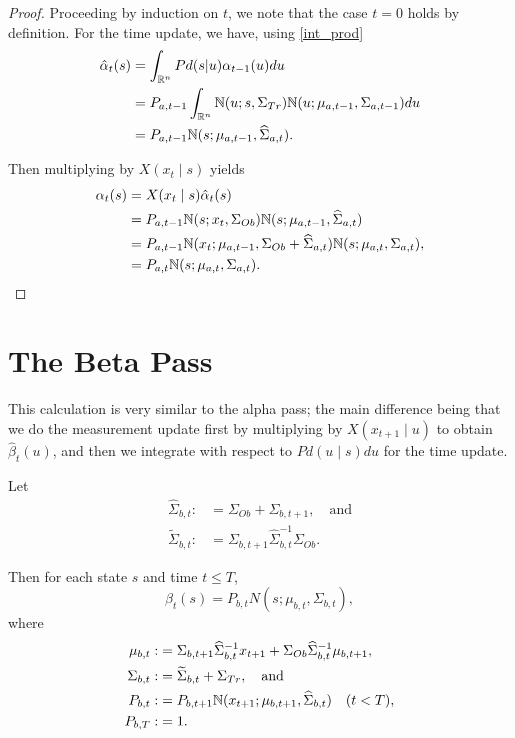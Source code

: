 \documentclass[12pt,leqno]{article}
\begin{document}
\begin{proof}

Proceeding by induction on $t$, we note that the case $t = 0$ holds by definition.
For the time update, we have, using \eqref{int_prod}
\begin{align}
  \hat{\alpha}_t(s) &= \int_{{\mathbb R}^n}Pd(s|u)\alpha_{t-1}(u)du \\\notag
 &= P_{a,t-1}\int_{{\mathbb R}^n}{\mathbb N}(u;s,\Sigma_{Tr}){\mathbb N}(u;\mu_{a,t-1},\Sigma_{a,t-1})du \notag\\
 &= P_{a,t-1}{\mathbb N}(s;\mu_{a,t-1},\widehat{\Sigma}_{a,t}).
\end{align}

Then multiplying by $X(x_t\mid s)$ yields
\begin{align*}
  \alpha_t(s) &= X(x_t\mid s)\hat{\alpha}_t(s) \\
  &= P_{a,t-1}{\mathbb N}(s;x_t,\Sigma_{Ob}){\mathbb N}(s;\mu_{a,t-1},\widehat{\Sigma}_{a,t}) \\
  &= P_{a,t-1}{\mathbb N}(x_t;\mu_{a,t-1},\Sigma_{Ob} + \widehat{\Sigma}_{a,t}){\mathbb N}(s;\mu_{a,t},\Sigma_{a,t}), \\
  &= P_{a,t}{\mathbb N}(s;\mu_{a,t},\Sigma_{a,t}).
\end{align*}
\end{proof}

\section{The Beta Pass}
This calculation is very similar to the alpha pass; the main difference being that we do
the measurement update first by multiplying by $X(x_{t+1}\mid u)$ to obtain $\hat{\beta}_t(u)$,
and then we integrate with respect to $Pd(u\mid s)du$ for the time update.  

\begin{Thm}\label{beta:1}
  Let 
\begin{align*}
  \widehat{\Sigma}_{b,t} :&= \Sigma_{Ob}+\Sigma_{b,t+1},\quad\text{and}\\
    \widetilde{\Sigma}_{b,t} :&= \Sigma_{b,t+1}\widehat{\Sigma}_{b,t}^{-1}\Sigma_{Ob}.
\end{align*}

  Then for each state $s$ and time $t \le T$,
$$
  \beta_t(s) = P_{b,t}N(s;\mu_{b,t},\Sigma_{b,t}),
$$
where
\begin{align*}
  \mu_{b,t} :&= \Sigma_{b,t+1}\widehat{\Sigma}_{b,t}^{-1}x_{t+1} + \Sigma_{Ob}\widehat{\Sigma}_{b,t}^{-1}\mu_{b,t+1},\\
  \Sigma_{b,t} :&= \widetilde{\Sigma}_{b,t} + \Sigma_{Tr},\quad\text{and}\\
  P_{b,t}:&=P_{b,t+1}{\mathbb N}(x_{t+1};\mu_{b,t+1},\widehat{\Sigma}_{b,t})
\quad(t< T),\\
  P_{b,T} :&= 1.
\end{align*}
\end{Thm}
\end{document}
